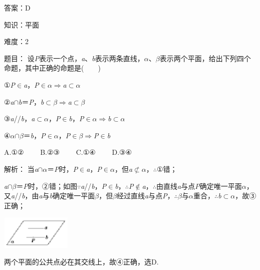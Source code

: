 \documentclass{article} %
\begin{document}
答案：D

知识：平面

难度：2

题目：
设\textit{P}表示一个点，\textit{a}、\textit{b}表示两条直线，\textit{$\alpha$}、\textit{$\beta$}表示两个平面，给出下列四个命题，其中正确的命题是(　　)

①\textit{P}$\mathrm{\in}$\textit{a}，\textit{P}$\mathrm{\in}$\textit{$\alpha$}$\mathrm{\Rightarrow }$\textit{a}$\mathrm{\subset }$\textit{$\alpha$}

②\textit{a}$\mathrm{\cap}$\textit{b}＝\textit{P}，\textit{b}$\mathrm{\subset }$\textit{$\beta$}$\mathrm{\Rightarrow }$\textit{a}$\mathrm{\subset }$\textit{$\beta$}

③\textit{a}//\textit{b}，\textit{a}$\mathrm{\subset }$\textit{$\alpha$}，\textit{P}$\mathrm{\in}$\textit{b}，\textit{P}$\mathrm{\in}$\textit{$\alpha$}$\mathrm{\Rightarrow }$\textit{b}$\mathrm{\subset }$\textit{$\alpha$}

④\textit{$\alpha$}$\mathrm{\cap}$\textit{$\beta$}＝\textit{b}，\textit{P}$\mathrm{\in}$\textit{$\alpha$}，\textit{P}$\mathrm{\in}$\textit{$\beta$}$\mathrm{\Rightarrow }$\textit{P}$\mathrm{\in}$\textit{b}

A.①②　　 B.②③　　 C.①④　　 D.③④

解析：
当\textit{a}$\mathrm{\cap}$\textit{$\alpha$}＝\textit{P}时，\textit{P}$\mathrm{\in}$\textit{a}，\textit{P}$\mathrm{\in}$\textit{$\alpha$}，但\textit{a}$\mathrm{\nsubset}$\textit{$\alpha$}，$\mathrm{\therefore}$①错；

\textit{a}$\mathrm{\cap}$\textit{$\beta$}＝\textit{P}时，②错；如图$\mathrm{\because}$\textit{a}//\textit{b}，\textit{P}$\mathrm{\in}$\textit{b}，$\mathrm{\therefore}$\textit{P}$\mathrm{\notin}$\textit{a}，$\mathrm{\therefore}$由直线\textit{a}与点\textit{P}确定唯一平面\textit{$\alpha$}，又\textit{a}//\textit{b}，由\textit{a}与\textit{b}确定唯一平面\textit{$\beta$}，但\textit{$\beta$}经过直线\textit{a}与点\textit{P}，$\mathrm{\therefore}$\textit{$\beta$}与\textit{$\alpha$}重合，$\mathrm{\therefore}$\textit{b}$\mathrm{\subset }$\textit{$\alpha$}，故③正确；

\includegraphics*[width=1.34in, height=0.63in, keepaspectratio=false]{image93}

两个平面的公共点必在其交线上，故④正确，选D.
\end{document}
